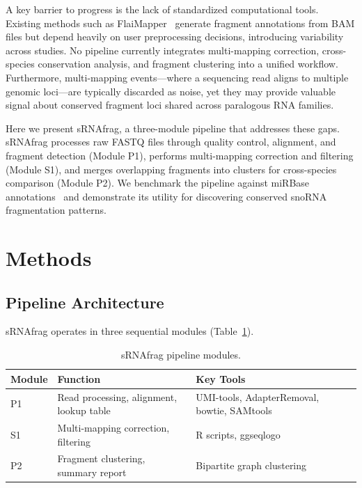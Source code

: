 \documentclass[11pt]{article}
\begin{document}
A key barrier to progress is the lack of standardized computational tools.  Existing methods such as FlaiMapper~\citep{hertog2021flaimapper} generate fragment annotations from BAM files but depend heavily on user preprocessing decisions, introducing variability across studies.  No pipeline currently integrates multi-mapping correction, cross-species conservation analysis, and fragment clustering into a unified workflow.  Furthermore, multi-mapping events---where a sequencing read aligns to multiple genomic loci---are typically discarded as noise, yet they may provide valuable signal about conserved fragment loci shared across paralogous RNA families.

Here we present sRNAfrag, a three-module pipeline that addresses these gaps.  sRNAfrag processes raw FASTQ files through quality control, alignment, and fragment detection (Module P1), performs multi-mapping correction and filtering (Module S1), and merges overlapping fragments into clusters for cross-species comparison (Module P2).  We benchmark the pipeline against miRBase annotations~\citep{kozomara2019mirbase} and demonstrate its utility for discovering conserved snoRNA fragmentation patterns.

\section{Methods}

\subsection{Pipeline Architecture}

sRNAfrag operates in three sequential modules (Table~\ref{tab:modules}).

\begin{table}[ht]
\centering
\caption{sRNAfrag pipeline modules.}
\label{tab:modules}
\begin{tabular}{@{}lll@{}}
\toprule
Module & Function & Key Tools \\
\midrule
P1 & Read processing, alignment, lookup table & UMI-tools, AdapterRemoval, bowtie, SAMtools \\
S1 & Multi-mapping correction, filtering & R scripts, ggseqlogo \\
P2 & Fragment clustering, summary report & Bipartite graph clustering \\
\bottomrule
\end{tabular}
\end{table}
\end{document}
